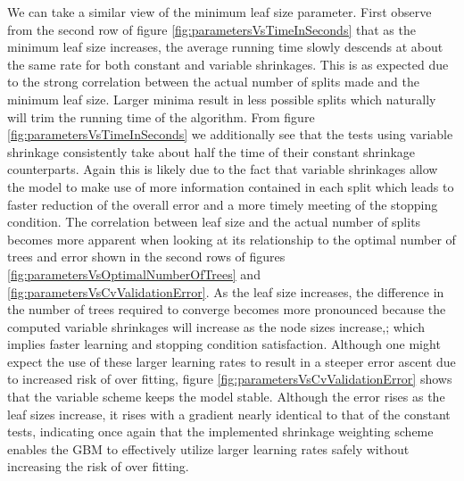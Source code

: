 \documentclass[9pt, conference]{IEEEtran}
\begin{document}
We can take a similar view of the minimum leaf size parameter. First observe from the second row of figure \ref{fig:parametersVsTimeInSeconds}  that as the minimum leaf size increases, the average running time slowly descends at about the same rate for both constant and variable shrinkages. This is as expected due to the strong correlation between the actual number of splits made and the minimum leaf size. Larger minima result in less possible splits which naturally will trim the running time of the algorithm. From figure \ref{fig:parametersVsTimeInSeconds} we additionally see that the tests using variable shrinkage consistently take about half the time of their constant shrinkage counterparts. Again this is likely due to the fact that variable shrinkages allow the model to make use of more information contained in each split which leads to faster reduction of the overall error and a more timely meeting of the stopping condition. The correlation between leaf size and the actual number of splits becomes more apparent when looking at its relationship to the optimal number of trees and error shown in the second rows of figures  \ref{fig:parametersVsOptimalNumberOfTrees} and \ref{fig:parametersVsCvValidationError}. As the leaf size increases, the difference in the number of trees required to converge becomes more pronounced because the computed variable shrinkages will increase as the node sizes increase,; which implies faster learning and stopping condition satisfaction. Although one might expect the use of these larger learning rates to result in a steeper error ascent due to increased risk of over fitting, figure \ref{fig:parametersVsCvValidationError} shows that the variable scheme keeps the model stable. Although the error rises as the leaf sizes increase, it rises with a gradient nearly identical to that of the constant tests, indicating once again that the implemented shrinkage weighting scheme enables the GBM to effectively utilize larger learning rates safely without increasing the risk of over fitting.
 
\end{document}
